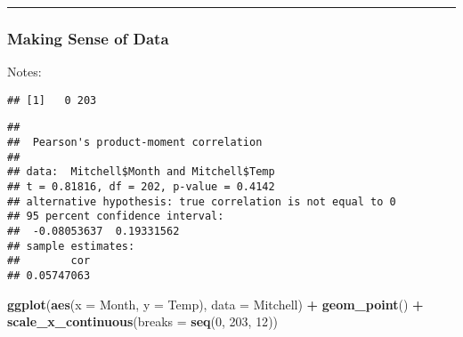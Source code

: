 \documentclass[]{article}
\newenvironment{Shaded}{\begin{snugshade}}{\end{snugshade}}
\newcommand{\KeywordTok}[1]{\textcolor[rgb]{0.13,0.29,0.53}{\textbf{#1}}}
\newcommand{\DataTypeTok}[1]{\textcolor[rgb]{0.13,0.29,0.53}{#1}}
\newcommand{\DecValTok}[1]{\textcolor[rgb]{0.00,0.00,0.81}{#1}}
\newcommand{\StringTok}[1]{\textcolor[rgb]{0.31,0.60,0.02}{#1}}
\newcommand{\OperatorTok}[1]{\textcolor[rgb]{0.81,0.36,0.00}{\textbf{#1}}}
\newcommand{\NormalTok}[1]{#1}
\begin{document}
\begin{center}\rule{0.5\linewidth}{\linethickness}\end{center}

\subsubsection{Making Sense of Data}\label{making-sense-of-data}

Notes:

\begin{Shaded}
\end{Shaded}

\begin{verbatim}
## [1]   0 203
\end{verbatim}

\begin{Shaded}
\end{Shaded}

\begin{verbatim}
## 
##  Pearson's product-moment correlation
## 
## data:  Mitchell$Month and Mitchell$Temp
## t = 0.81816, df = 202, p-value = 0.4142
## alternative hypothesis: true correlation is not equal to 0
## 95 percent confidence interval:
##  -0.08053637  0.19331562
## sample estimates:
##        cor 
## 0.05747063
\end{verbatim}

\begin{Shaded}
\begin{Highlighting}[]
\KeywordTok{ggplot}\NormalTok{(}\KeywordTok{aes}\NormalTok{(}\DataTypeTok{x =}\NormalTok{ Month, }\DataTypeTok{y =}\NormalTok{ Temp), }\DataTypeTok{data =}\NormalTok{ Mitchell) }\OperatorTok{+}
\StringTok{  }\KeywordTok{geom_point}\NormalTok{() }\OperatorTok{+}
\StringTok{  }\KeywordTok{scale_x_continuous}\NormalTok{(}\DataTypeTok{breaks =} \KeywordTok{seq}\NormalTok{(}\DecValTok{0}\NormalTok{, }\DecValTok{203}\NormalTok{, }\DecValTok{12}\NormalTok{))}
\end{Highlighting}
\end{Shaded}
\end{document}
